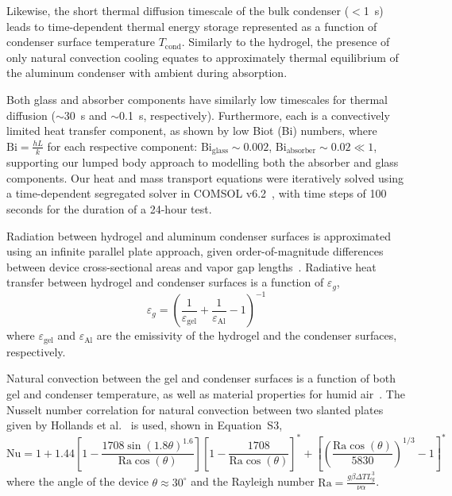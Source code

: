 \documentclass[11pt]{article}
\begin{document}
Likewise, the short thermal diffusion timescale of the bulk condenser ($<$1~s) leads to time-dependent thermal energy storage represented as a function of condenser surface temperature $T_{\mathrm{cond}}$. Similarly to the hydrogel, the presence of only natural convection cooling equates to approximately thermal equilibrium of the aluminum condenser with ambient during absorption.

Both glass and absorber components have similarly low timescales for thermal diffusion ($\sim$30~s and $\sim$0.1~s, respectively). Furthermore, each is a convectively limited heat transfer component, as shown by low Biot (Bi) numbers, where $\mathrm{Bi} = \frac{hL}{k}$ for each respective component: $\mathrm{Bi}_{\mathrm{glass}} \sim 0.002$, $\mathrm{Bi}_{\mathrm{absorber}} \sim 0.02 \ll 1$, supporting our lumped body approach to modelling both the absorber and glass components. Our heat and mass transport equations were iteratively solved using a time-dependent segregated solver in COMSOL v6.2~\cite{scomsol2021}, with time steps of 100 seconds for the duration of a 24-hour test.

Radiation between hydrogel and aluminum condenser surfaces is approximated using an infinite parallel plate approach, given order-of-magnitude differences between device cross-sectional areas and vapor gap lengths~\cite{skaviany2011}. Radiative heat transfer between hydrogel and condenser surfaces is a function of $\varepsilon_g$,
\begin{equation}
\varepsilon_g = \left(\frac{1}{\varepsilon_{\mathrm{gel}}} + \frac{1}{\varepsilon_{\mathrm{Al}}} - 1\right)^{-1}
\end{equation}
where $\varepsilon_{\mathrm{gel}}$ and $\varepsilon_{\mathrm{Al}}$ are the emissivity of the hydrogel and the condenser surfaces, respectively.

Natural convection between the gel and condenser surfaces is a function of both gel and condenser temperature, as well as material properties for humid air~\cite{sbell2014}. The Nusselt number correlation for natural convection between two slanted plates given by Hollands et al.~\cite{shollands1976} is used, shown in Equation~S3,
\begin{equation}
\mathrm{Nu} = 1 + 1.44\left[1 - \frac{1708\sin(1.8\theta)^{1.6}}{\mathrm{Ra}\cos(\theta)}\right]\left[1 - \frac{1708}{\mathrm{Ra}\cos(\theta)}\right]^{*} + \left[\left(\frac{\mathrm{Ra}\cos(\theta)}{5830}\right)^{1/3} - 1\right]^{*}
\end{equation}
where the angle of the device $\theta \approx 30^\circ$ and the Rayleigh number $\mathrm{Ra} = \frac{g\beta\Delta T L_g^3}{\nu\alpha}$.
\end{document}
